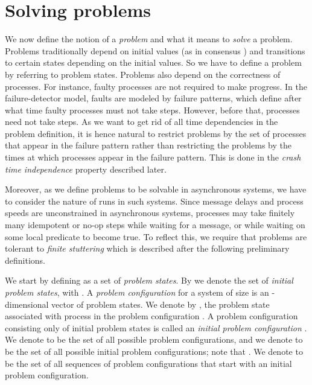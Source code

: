 \documentclass[11pt]{article}
\begin{document}
\section{Solving problems}\label{sec:problemDefinition}

We now define the notion of a \emph{problem} and what it means to
     \emph{solve} a problem.
Problems traditionally depend on initial values (as in consensus
     \cite{FLP}) and transitions to certain states depending on the
     initial values.
So we have to define a problem by referring to problem states.
Problems also depend on the correctness of processes.
For instance, faulty processes are not required to make progress.
In the failure-detector model, faults are modeled by failure patterns,
     which define after what time faulty processes must not take
     steps.
However, before that, processes need not take steps.
As we want to get rid of all time dependencies in the problem
     definition, it is hence natural to restrict problems by the set
     of processes that appear in the failure pattern rather than
     restricting the problems by the times at which  processes appear
     in the failure pattern.
This is done in the \emph{crash time independence} property described
     later.

Moreover, as we define problems to be solvable in asynchronous
     systems, we have to consider the nature of runs in such systems.
Since message delays and process speeds are unconstrained in
     asynchronous systems, processes may take finitely many idempotent
     or no-op steps while waiting for a message, or while waiting on
     some local predicate to become true.
To reflect this, we require that problems are tolerant to \emph{finite
     stuttering} which is described after the following preliminary
     definitions.

We start by defining  as a set of \emph{problem states}.
By  we denote the set of \emph{initial problem states},
     with .
A \emph{problem configuration}  for a system of size  is an
     -dimensional vector of problem states.
We denote by , the problem state associated with process
      in the problem configuration .
A problem configuration consisting only of initial problem states is
     called an \emph{initial problem configuration} .
We denote  to be the set of all possible problem
     configurations, and we denote  to be the set of all
     possible initial problem configurations; note that .
We denote  to be the set of all sequences of problem
     configurations that start with an initial problem configuration.
\end{document}
